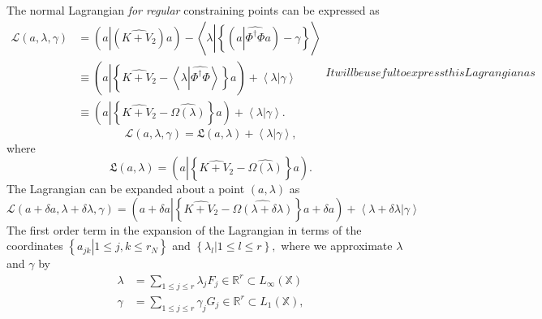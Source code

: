 \documentclass[aps,preprint]{revtex4}%
\begin{document}
The normal Lagrangian \emph{for regular} constraining points can be expressed
as
\begin{subequations}
\begin{align}
\mathcal{L}\left(  a,\lambda,\gamma\right)   &  =\left(  a\left\vert \left(
\widehat{K+V_{2}}\right)  \right.  a\right)  -\left\langle \lambda\left\vert
\left\{  \left(  a\left\vert \widehat{\Phi^{\dagger}\Phi}\right.  a\right)
-\gamma\right\}  \right.  \right\rangle \nonumber\\
&  \equiv\left(  a\left\vert \left\{  \widehat{K+V_{2}}-\left\langle
\lambda\left\vert \widehat{\Phi^{\dagger}\Phi}\right.  \right\rangle \right\}
\right.  a\right)  +\left\langle \lambda\left\vert \overset{}{\gamma}\right.
\right\rangle \nonumber\\
&  \equiv\left(  a\left\vert \left\{  \widehat{K+V_{2}}-\widehat{\Omega\left(
\lambda\right)  }\right\}  \right.  a\right)  +\left\langle \lambda\left\vert
\overset{}{\gamma}\right.  \right\rangle .
\end{align}
It will be useful to express this Lagrangian as
\end{subequations}
\begin{equation}
\mathcal{L}\left(  a,\lambda,\gamma\right)  =\mathfrak{L}\left(
a,\lambda\right)  +\left\langle \lambda\left\vert \overset{}{\gamma}\right.
\right\rangle ,
\end{equation}
where
\begin{equation}
\mathfrak{L}\left(  a,\lambda\right)  =\left(  a\left\vert \left\{
\widehat{K+V_{2}}-\widehat{\Omega\left(  \lambda\right)  }\right\}  \right.
a\right)  .
\end{equation}
The Lagrangian can be expanded about a point $\left(  a,\lambda\right)  $ as
\begin{equation}
\mathcal{L}\left(  a+\delta a,\lambda+\delta\lambda,\gamma\right)  =\left(
a+\delta a\left\vert \left\{  \widehat{K+V_{2}}-\widehat{\Omega\left(
\lambda+\delta\lambda\right)  }\right\}  \right.  a+\delta a\right)
+\left\langle \lambda+\delta\lambda\left\vert \overset{}{\gamma}\right.
\right\rangle
\end{equation}
The first order term in the expansion of the Lagrangian in terms of the
coordinates $\left\{  \left.  a_{jk}\right\vert 1\leq j,k\leq r_{N}\right\}  $
and $\left\{  \left.  \lambda_{l}\right\vert 1\leq l\leq r\right\}  ,$ where
we approximate $\lambda$ and $\gamma$ by
\begin{align}
\lambda &  =\sum_{1\leq j\leq r}\lambda_{j}F_{j}\in\mathbb{R}^{r}\subset
L_{\infty}\left(  \mathbb{X}\right) \nonumber\\
\gamma &  =\sum_{1\leq j\leq r}\gamma_{j}G_{j}\in\mathbb{R}^{r}\subset
L_{1}\left(  \mathbb{X}\right)  ,
\end{align}
\end{document}
